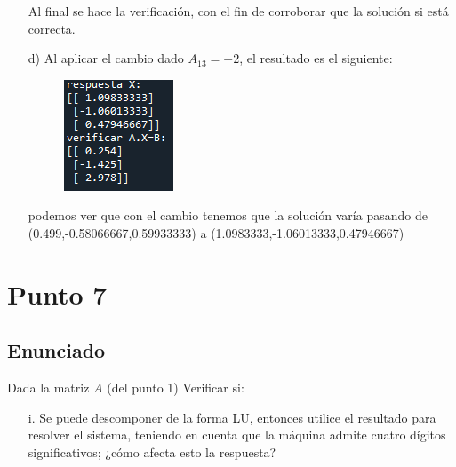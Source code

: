 \documentclass[10pt,letterpaper]{article}
\begin{document}
\begin{center}
\begin{enumerate}
\begin{figure}[H]
				\centering
			\end{figure}
			Al final se hace la verificación, con el fin de corroborar que la solución si está correcta.
			\item[d)] Al aplicar el cambio dado $A_{13}=-2$, el resultado es el siguiente:\\
			\begin{figure}[H]
				\includegraphics{imagen5}
				\centering
			\end{figure}
			podemos ver que con el cambio tenemos que la solución varía pasando de (0.499,-0.58066667,0.59933333) a (1.0983333,-1.06013333,0.47946667)
		\end{enumerate}
		
	\end{center}		
\section{Punto 7}
	
	\subsection{Enunciado}
	Dada la matriz $A$ (del punto 1) Verificar si:
	\begin{enumerate}
		\item[i.] Se puede descomponer de la forma LU, entonces utilice el resultado para resolver el sistema, teniendo en cuenta que la máquina admite cuatro dígitos significativos; ¿cómo afecta esto la respuesta?
	\end{enumerate}
	
\end{document}
